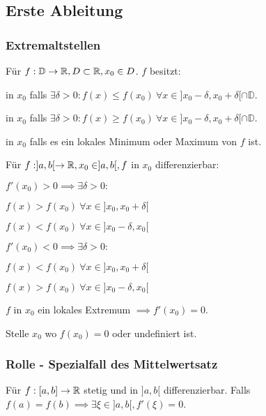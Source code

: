 \subsection{Erste Ableitung}
\subsubsection{Extremaltstellen}
Für $f:\mathbb{D} \to \mathbb{R}, D \subset \mathbb{R}, x_0 \in D$. $f$ besitzt:
\begin{compactdesc}
    \item[Lokales Maximum:] in $x_0$ falls $\exists \delta > 0: f(x) \le f(x_0) \ \forall x \in ]x_0 - \delta, x_0 + \delta[ \cap \mathbb{D}$.
    \item[Lokales Minimum:] in $x_0$ falls $\exists \delta > 0: f(x) \ge f(x_0) \ \forall x \in ]x_0 - \delta, x_0 + \delta[ \cap \mathbb{D}$.
    \item[Lokales Extremum:] in $x_0$ falls es ein lokales Minimum oder Maximum von $f$ ist.
\end{compactdesc}
Für $f:] a, b[ \to \mathbb{R}, x_0 \in ]a, b[, f$ in $x_0$ differenzierbar:
\begin{compactenum}
    \item $f'(x_0) > 0 \implies \exists \delta > 0:$
        \begin{inparaitem}
            \item $f(x) > f(x_0) \ \forall x \in ]x_0, x_0 + \delta[$
            \item $f(x) < f(x_0) \ \forall x \in ]x_0 - \delta, x_0[$
        \end{inparaitem}
    \item $f'(x_0) < 0 \implies \exists \delta > 0:$
        \begin{inparaitem}
            \item $f(x) < f(x_0) \ \forall x \in ]x_0, x_0 + \delta[$
            \item $f(x) > f(x_0) \ \forall x \in ]x_0 - \delta, x_0[$
        \end{inparaitem}
    \item $f$ in $x_0$ ein lokales Extremum $\implies f'(x_0) = 0$.
\end{compactenum}
\begin{compactdesc}
\item[Kritischer Punkt:] Stelle $x_0$ wo $f(x_0) = 0$ oder undefiniert ist.
\end{compactdesc}

\subsubsection{Rolle - Spezialfall des Mittelwertsatz}
Für $f:[a,b] \to \mathbb{R}$ stetig und in $]a, b[$ differenzierbar. Falls $f(a) = f(b) \implies \exists \xi \in ]a, b[, f'(\xi) = 0$.

